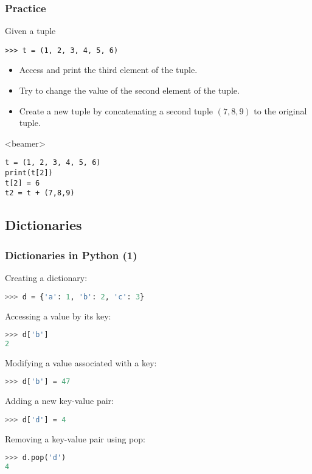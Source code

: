 \begin{frame}[fragile]
  \frametitle{Practice}
  Given a tuple
  \begin{lstlisting}
>>> t = (1, 2, 3, 4, 5, 6)
  \end{lstlisting}
  \begin{itemize}
   \item Access and print the third element of the tuple.
   \item Try to change the value of the second element of the tuple.
   \item Create a new tuple by concatenating a second tuple \((7, 8, 9)\) to the original tuple.
  \end{itemize}\pause
  \begin{onlyenv}<beamer>
    \begin{lstlisting}[]
t = (1, 2, 3, 4, 5, 6)
print(t[2])
t[2] = 6
t2 = t + (7,8,9)
    \end{lstlisting}
  \end{onlyenv}
 \end{frame}

\subsection{Dictionaries}
\begin{frame}[fragile]
  \frametitle{Dictionaries in Python (1)}
  Creating a dictionary:
  \begin{lstlisting}[language=Python,numbers=none]
>>> d = {'a': 1, 'b': 2, 'c': 3}
  \end{lstlisting}
  Accessing a value by its key:
  \begin{lstlisting}[language=Python,numbers=none]
>>> d['b']
2
  \end{lstlisting}
  Modifying a value associated with a key:
  \begin{lstlisting}[language=Python,numbers=none]
>>> d['b'] = 47
  \end{lstlisting}
  Adding a new key-value pair:
  \begin{lstlisting}[language=Python,numbers=none]
>>> d['d'] = 4
  \end{lstlisting}
  Removing a key-value pair using pop:
  \begin{lstlisting}[language=Python,numbers=none]
>>> d.pop('d')
4
  \end{lstlisting}
\end{frame}

